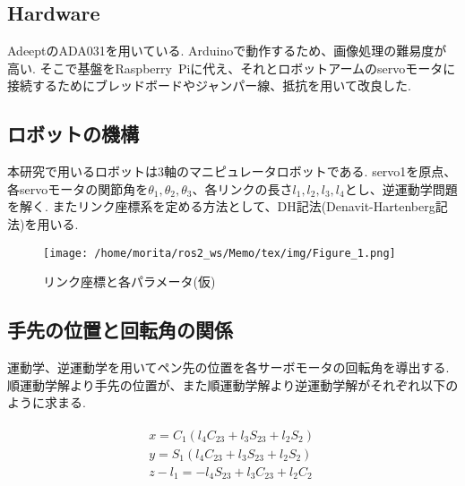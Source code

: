 \documentclass[10pt]{jarticle}
\begin{document}
	\subsection{Hardware}
	AdeeptのADA031を用いている.
	Arduinoで動作するため、画像処理の難易度が高い.
	そこで基盤をRaspberry\ Piに代え、それとロボットアームのservoモータに接続するためにブレッドボードやジャンパー線、抵抗を用いて改良した.
	
	\subsection{ロボットの機構}
	本研究で用いるロボットは3軸のマニピュレータロボットである.
	servo1を原点、各servoモータの関節角を$\theta_1, \theta_2, \theta_3$、各リンクの長さ$l_1, l_2, l_3, l_4$とし、逆運動学問題を解く.
	またリンク座標系を定める方法として、DH記法(Denavit-Hartenberg記法)を用いる.

    \begin{center}
        \begin{figure}[h]
            \texttt{[image: /home/morita/ros2\_ws/Memo/tex/img/Figure\_1.png]}
            \caption{リンク座標と各パラメータ(仮)}
            \label{manipulator}
        \end{figure}
    \end{center}
    
	\subsection{手先の位置と回転角の関係}
	
	運動学、逆運動学を用いてペン先の位置を各サーボモータの回転角を導出する.
	順運動学解より手先の位置が、また順運動学解より逆運動学解がそれぞれ以下のように求まる.
	
	\scriptsize
	\begin{equation}
		\begin{array}{c}
			\begin{split}
				&  x  =  C_1(l_4C_{23}  +  l_3S_{23}  +  l_2S_2)\quad \\
				&  y  =  S_1(l_4C_{23}  +  l_3S_{23}  +  l_2S_2)\quad \\
				&  z  -  l_1  =  -l_4S_{23}  +  l_3C_{23}  +  l_2C_2\quad \\
			\end{split}
		\end{array}
	\end{equation}
\end{document}
